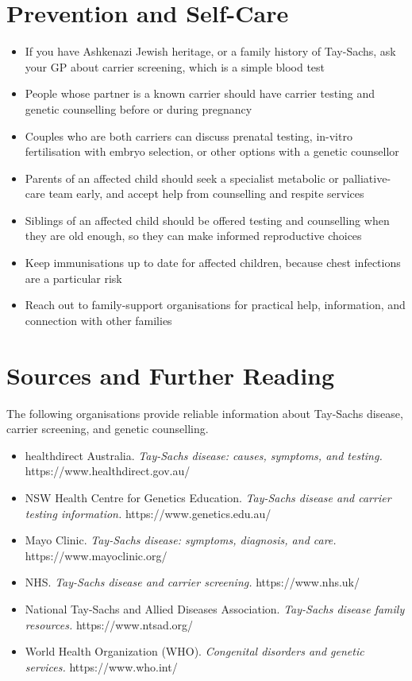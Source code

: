 \section*{Prevention and Self-Care}
\begin{itemize}
    \item If you have Ashkenazi Jewish heritage, or a family history of Tay-Sachs, ask your GP about carrier screening, which is a simple blood test
    \item People whose partner is a known carrier should have carrier testing and genetic counselling before or during pregnancy
    \item Couples who are both carriers can discuss prenatal testing, in-vitro fertilisation with embryo selection, or other options with a genetic counsellor
    \item Parents of an affected child should seek a specialist metabolic or palliative-care team early, and accept help from counselling and respite services
    \item Siblings of an affected child should be offered testing and counselling when they are old enough, so they can make informed reproductive choices
    \item Keep immunisations up to date for affected children, because chest infections are a particular risk
    \item Reach out to family-support organisations for practical help, information, and connection with other families
\end{itemize}

\section*{Sources and Further Reading}
The following organisations provide reliable information about Tay-Sachs disease, carrier screening, and genetic counselling.

\begin{itemize}
    \item healthdirect Australia. \textit{Tay-Sachs disease: causes, symptoms, and testing.} https://www.healthdirect.gov.au/
    \item NSW Health Centre for Genetics Education. \textit{Tay-Sachs disease and carrier testing information.} https://www.genetics.edu.au/
    \item Mayo Clinic. \textit{Tay-Sachs disease: symptoms, diagnosis, and care.} https://www.mayoclinic.org/
    \item NHS. \textit{Tay-Sachs disease and carrier screening.} https://www.nhs.uk/
    \item National Tay-Sachs and Allied Diseases Association. \textit{Tay-Sachs disease family resources.} https://www.ntsad.org/
    \item World Health Organization (WHO). \textit{Congenital disorders and genetic services.} https://www.who.int/
\end{itemize}

\clearpage
